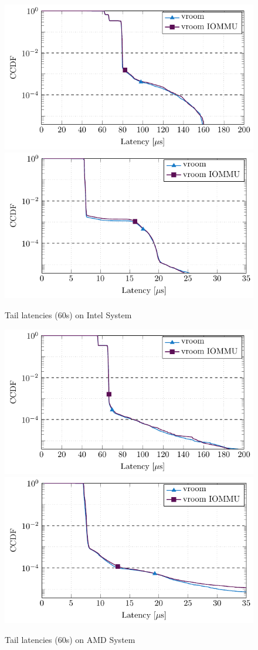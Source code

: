 \begin{figure}[H]
  \centering
   {\includegraphics[width=.70\textwidth]{figures/lats_ccdf_2MiB_qd1t1_read} \label{fig:ccdf-read}}
   {\includegraphics[width=.70\textwidth]{figures/lats_ccdf_2MiB_qd1t1} \label{fig:ccdf-write}}
  \caption{Tail latencies (60s) on Intel System}
  \label{fig:ccdf}
\end{figure}

\begin{figure}[H]
  \centering
   {\includegraphics[width=.70\textwidth]{figures/lats_ccdf_2MiB_qd1t1_read_epyc} \label{fig:ccdf-read-epyc}}
   {\includegraphics[width=.70\textwidth]{figures/lats_ccdf_2MiB_qd1t1_epyc} \label{fig:ccdf-write-epyc}}
  \caption{Tail latencies (60s) on AMD System}
  \label{fig:ccdf-epyc}
\end{figure}

